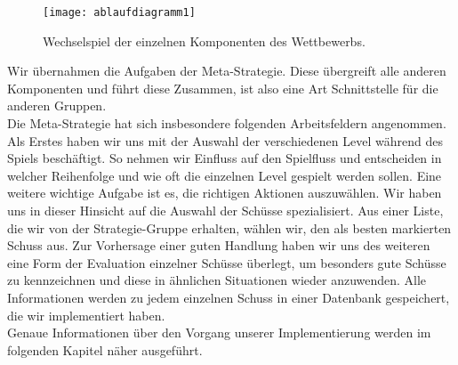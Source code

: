 \begin{figure} [h]
	\begin{center}
		\texttt{[image: ablaufdiagramm1]}
		\caption{Wechselspiel der einzelnen Komponenten des Wettbewerbs.}
	\end{center}
\end{figure}

Wir übernahmen die Aufgaben der Meta-Strategie. Diese übergreift alle anderen Komponenten und führt diese Zusammen, ist also eine Art Schnittstelle für die anderen Gruppen.\\
Die Meta-Strategie hat sich insbesondere folgenden Arbeitsfeldern angenommen. Als Erstes haben wir uns mit der Auswahl der verschiedenen Level während des Spiels beschäftigt. So nehmen wir Einfluss auf den Spielfluss und entscheiden in welcher Reihenfolge und wie oft die einzelnen Level gespielt werden sollen.
Eine weitere wichtige Aufgabe ist es, die richtigen Aktionen auszuwählen. Wir haben uns in dieser Hinsicht auf die Auswahl der Schüsse spezialisiert. Aus einer Liste, die wir von der Strategie-Gruppe erhalten, wählen wir, den als besten markierten Schuss aus. Zur Vorhersage einer guten Handlung haben wir uns des weiteren eine Form der Evaluation einzelner Schüsse überlegt, um besonders gute Schüsse zu kennzeichnen und diese in ähnlichen Situationen wieder anzuwenden.
Alle Informationen werden zu jedem einzelnen Schuss in einer Datenbank gespeichert, die wir implementiert haben.\\
Genaue Informationen über den Vorgang unserer Implementierung werden im folgenden Kapitel näher ausgeführt.